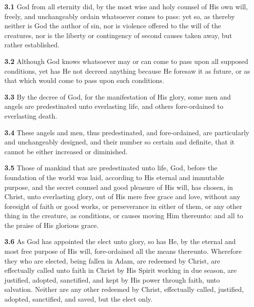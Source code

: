\par\textbf{3.1} God from all eternity did, by the most wise and holy counsel of His own will, freely, and unchangeably ordain whatsoever comes to pass: yet so, as thereby neither is God the author of sin, nor is violence offered to the will of the creatures, nor is the liberty or contingency of second causes taken away, but rather established.   


\par\textbf{3.2} Although God knows whatsoever may or can come to pass upon all supposed conditions, yet has He not decreed anything because He foresaw it as future, or as that which would come to pass upon such conditions.   
\par\textbf{3.3} By the decree of God, for the manifestation of His glory, some men and angels are predestinated unto everlasting life, and others fore-ordained to everlasting death.   
\par\textbf{3.4} These angels and men, thus predestinated, and fore-ordained, are particularly and unchangeably designed, and their number so certain and definite, that it cannot be either increased or diminished.   
\par\textbf{3.5} Those of mankind that are predestinated unto life, God, before the foundation of the world was laid, according to His eternal and immutable purpose, and the secret counsel and good pleasure of His will, has chosen, in Christ, unto everlasting glory, out of His mere free grace and love, without any foresight of faith or good works, or perseverance in either of them, or any other thing in the creature, as conditions, or causes moving Him thereunto: and all to the praise of His glorious grace.   

\par\textbf{3.6} As God has appointed the elect unto glory, so has He, by the eternal and most free purpose of His will, fore-ordained all the means thereunto. Wherefore they who are elected, being fallen in Adam, are redeemed by Christ, are effectually called unto faith in Christ by His Spirit working in due season, are justified, adopted, sanctified, and kept by His power through faith, unto salvation. Neither are any other redeemed by Christ, effectually called, justified, adopted, sanctified, and saved, but the elect only.   

